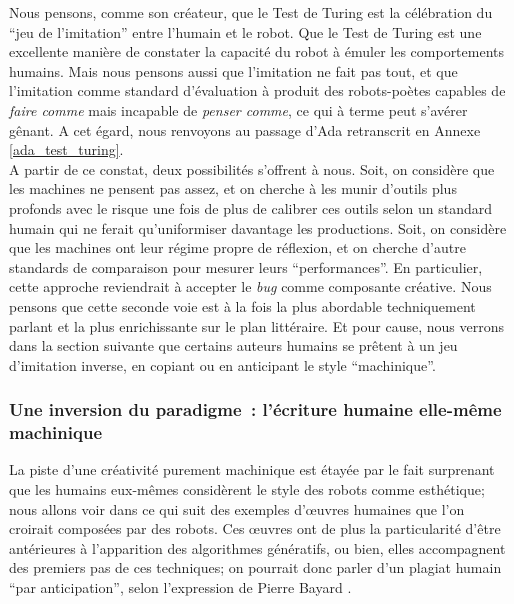 \documentclass{article}
\begin{document}
					Nous pensons, comme son créateur, que le Test de Turing est la célébration du ``jeu de l'imitation'' entre l'humain et le robot. Que le Test de Turing est une excellente manière de constater la capacité du robot à émuler les comportements humains. Mais nous pensons aussi que l'imitation ne fait pas tout, et que l'imitation comme standard d'évaluation à produit des robots-poètes capables de \textit{faire comme} mais incapable de \textit{penser comme}, ce qui à terme peut s'avérer gênant. A cet égard, nous renvoyons au passage d'Ada retranscrit en Annexe \ref{ada_test_turing}.\\
					
					A partir de ce constat, deux possibilités s'offrent à nous. Soit, on considère que les machines ne pensent pas assez, et on cherche à les munir d'outils plus profonds avec le risque une fois de plus de calibrer ces outils selon un standard humain qui ne ferait qu'uniformiser davantage les productions. Soit, on considère que les machines ont leur régime propre de réflexion, et on cherche d'autre standards de comparaison pour mesurer leurs ``performances''. En particulier, cette approche reviendrait à accepter le \textit{bug} comme composante créative. Nous pensons que cette seconde voie est à la fois la plus abordable techniquement parlant et la plus enrichissante sur le plan littéraire. Et pour cause, nous verrons dans la section suivante que certains auteurs humains se prêtent à un jeu d'imitation inverse, en copiant ou en anticipant le style ``machinique''.
					
			\subsubsection{Une inversion du paradigme~: l'écriture humaine elle-même machinique} \label{inversion_paradigme}
				La piste d'une créativité purement machinique est étayée par le fait surprenant que les humains eux-mêmes considèrent le style des robots comme esthétique; nous allons voir dans ce qui suit des exemples d'œuvres humaines que l'on croirait composées par des robots. Ces œuvres ont de plus la particularité d'être antérieures à l'apparition des algorithmes génératifs, ou bien, elles accompagnent des premiers pas de ces techniques; on pourrait donc parler d'un plagiat humain ``par anticipation'', selon l'expression de Pierre Bayard \cite{bayard2002}.\\
				
\end{document}
